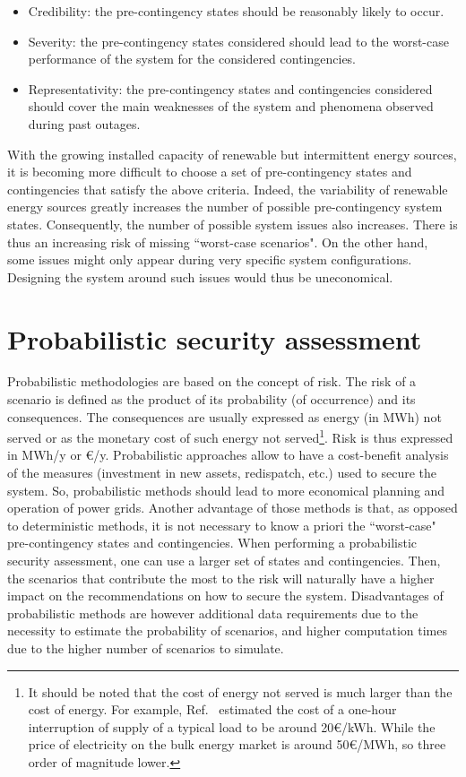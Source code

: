 \begin{itemize}
    \item Credibility: the pre-contingency states should be reasonably likely to occur.
    \item Severity: the pre-contingency states considered should lead to the worst-case performance of the system for the considered contingencies.
    \item Representativity: the pre-contingency states and contingencies considered should cover the main weaknesses of the system and phenomena observed during past outages.
\end{itemize}

With the growing installed capacity of renewable but intermittent energy sources, it is becoming more difficult to choose a set of pre-contingency states and contingencies that satisfy the above criteria. Indeed, the variability of renewable energy sources greatly increases the number of possible pre-contingency system states. Consequently, the number of possible system issues also increases. There is thus an increasing risk of missing ``worst-case scenarios". On the other hand, some issues might only appear during very specific system configurations. Designing the system around such issues would thus be uneconomical.


\section{Probabilistic security assessment}
\label{sec:probabilisticSecurity}

Probabilistic methodologies are based on the concept of risk. The risk of a scenario is defined as the product of its probability (of occurrence) and its consequences. The consequences are usually expressed as energy (in MWh) not served or as the monetary cost of such energy not served\footnote{It should be noted that the cost of energy not served is much larger than the cost of energy. For example, Ref.~\cite{VOLL} estimated the cost of a one-hour interruption of supply of a typical load to be around 20€/kWh. While the price of electricity on the bulk energy market is around 50€/MWh, so three order of magnitude lower.}. Risk is thus expressed in MWh/y or €/y. Probabilistic approaches allow to have a cost-benefit analysis of the measures (investment in new assets, redispatch, etc.) used to secure the system. So, probabilistic methods should lead to more economical planning and operation of power grids. Another advantage of those methods is that, as opposed to deterministic methods, it is not necessary to know a priori the ``worst-case" pre-contingency states and contingencies. When performing a probabilistic security assessment, one can use a larger set of states and contingencies. Then, the scenarios that contribute the most to the risk will naturally have a higher impact on the recommendations on how to secure the system. Disadvantages of probabilistic methods are however additional data requirements due to the necessity to estimate the probability of scenarios, and higher computation times due to the higher number of scenarios to simulate.


